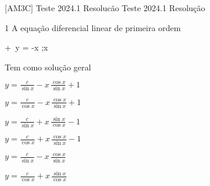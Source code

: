 \documentclass["AM3C-tests_resolutions.tex"]{subfiles}
\begin{document}

[AM3C]
{Teste 2024.1 Resolucão} %
{Teste 2024.1 Resolução} %

\group{}

\begin{questionBox}1{} %
  A equação diferencial linear de primeira ordem
  \begin{BM}
     + \,y
    = -x
    ;\quad x \in {}
  \end{BM}
  Tem como solução geral
  \begin{itemize}[label=\Box]
    \begin{multicols}{3}
      \item \(y = \frac{c}{\sin x} - x\,\frac{\cos x}{\sin x} +1\)
      \item \(y = \frac{c}{\cos x} - x\,\frac{\cos x}{\sin x} +1\)
      \item \(y = \frac{c}{\sin x} + x\,\frac{\sin x}{\cos x} -1\)
      \item \(y = \frac{c}{\cos x} + x\,\frac{\cos x}{\sin x} -1\)
      \item \(y = \frac{c}{\sin x} - x\,\frac{\cos x}{\sin x}\)
      \item \(y = \frac{c}{\cos x} + x\,\frac{\sin x}{\cos x}\)
    \end{multicols}
  \end{itemize}

  \answer{}


\end{questionBox}
\end{document}
